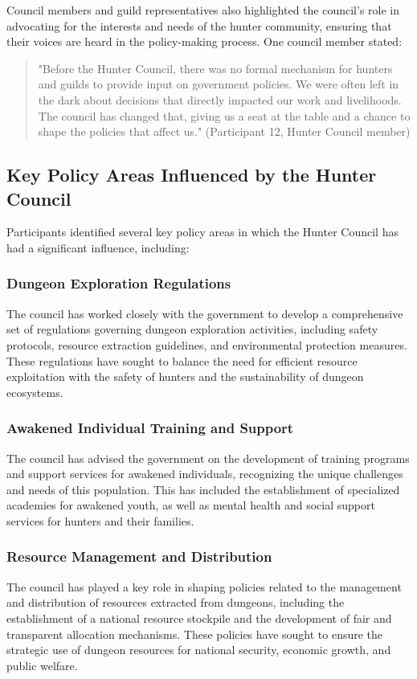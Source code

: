 \documentclass[12pt, a4paper]{article}
\begin{document}
Council members and guild representatives also highlighted the council's role in advocating for the interests and needs of the hunter community, ensuring that their voices are heard in the policy-making process. One council member stated:

\begin{quote}
    "Before the Hunter Council, there was no formal mechanism for hunters and guilds to provide input on government policies. We were often left in the dark about decisions that directly impacted our work and livelihoods. The council has changed that, giving us a seat at the table and a chance to shape the policies that affect us." (Participant 12, Hunter Council member)
\end{quote}

\subsection{Key Policy Areas Influenced by the Hunter Council}
Participants identified several key policy areas in which the Hunter Council has had a significant influence, including:

\subsubsection{Dungeon Exploration Regulations}
The council has worked closely with the government to develop a comprehensive set of regulations governing dungeon exploration activities, including safety protocols, resource extraction guidelines, and environmental protection measures. These regulations have sought to balance the need for efficient resource exploitation with the safety of hunters and the sustainability of dungeon ecosystems.

\subsubsection{Awakened Individual Training and Support}
The council has advised the government on the development of training programs and support services for awakened individuals, recognizing the unique challenges and needs of this population. This has included the establishment of specialized academies for awakened youth, as well as mental health and social support services for hunters and their families.

\subsubsection{Resource Management and Distribution}
The council has played a key role in shaping policies related to the management and distribution of resources extracted from dungeons, including the establishment of a national resource stockpile and the development of fair and transparent allocation mechanisms. These policies have sought to ensure the strategic use of dungeon resources for national security, economic growth, and public welfare.
\end{document}
